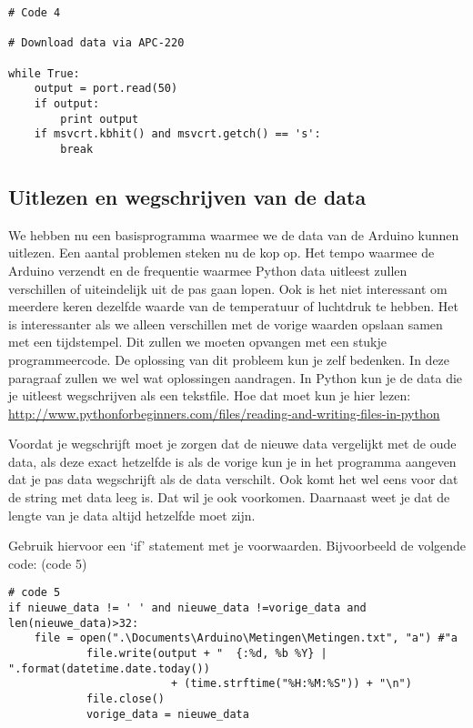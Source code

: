 \begin{verbatim}
# Code 4

# Download data via APC-220  
 
while True:
    output = port.read(50)
    if output:
        print output
    if msvcrt.kbhit() and msvcrt.getch() == 's':
        break
\end{verbatim}


\subsection{Uitlezen en wegschrijven van de data}

We hebben nu een basisprogramma waarmee we de data van de Arduino kunnen
uitlezen. Een aantal problemen steken nu de kop op. Het tempo waarmee de
Arduino verzendt en de frequentie waarmee Python data uitleest zullen
verschillen of uiteindelijk uit de pas gaan lopen. Ook is het niet
interessant om meerdere keren dezelfde waarde van de temperatuur of
luchtdruk te hebben. Het is interessanter als we alleen verschillen met
de vorige waarden opslaan samen met een tijdstempel. Dit zullen we moeten opvangen met een stukje
programmeercode. De oplossing van dit probleem kun je zelf bedenken.
In deze paragraaf zullen we wel wat oplossingen aandragen.
In Python kun je de data die je uitleest wegschrijven als een tekstfile.
Hoe dat moet kun je hier lezen:
\url{http://www.pythonforbeginners.com/files/reading-and-writing-files-in-python}

Voordat je wegschrijft moet je zorgen dat de nieuwe data vergelijkt met
de oude data, als deze exact hetzelfde is als de vorige kun je in het
programma aangeven dat je pas data wegschrijft als de data verschilt.
Ook komt het wel eens voor dat de string met data leeg is. Dat wil je
ook voorkomen. Daarnaast weet je dat de lengte van je data altijd
hetzelfde moet zijn.

Gebruik hiervoor een `if' statement met je voorwaarden. Bijvoorbeeld de volgende code:
(code 5)

\begin{verbatim}
# code 5
if nieuwe_data != ' ' and nieuwe_data !=vorige_data and len(nieuwe_data)>32:
    file = open(".\Documents\Arduino\Metingen\Metingen.txt", "a") #"a
            file.write(output + "  {:%d, %b %Y} | ".format(datetime.date.today())
                         + (time.strftime("%H:%M:%S")) + "\n")
            file.close()
            vorige_data = nieuwe_data
\end{verbatim}

